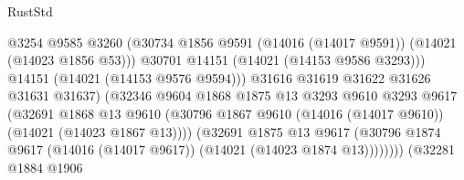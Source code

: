 \begin{lexlean}{RustStd}
\begin{coremodule}
                                              @3254
                                              @9585
                                              @3260
                                              (@30734
                                                @1856
                                                @9591
                                                (@14016 (@14017 @9591))
                                                (@14021 (@14023 @1856 @53)))
                                              @30701
                                              @14151
                                              (@14021 (@14153 @9586 @3293)))
                                            @14151
                                            (@14021 (@14153 @9576 @9594)))
                                          @31616
                                          @31619
                                          @31622
                                          @31626
                                          @31631
                                          @31637)
                                        (@32346
                                          @9604
                                          @1868
                                          @1875
                                          @13
                                          @3293
                                          @9610
                                          @3293
                                          @9617
                                          (@32691
                                            @1868
                                            @13
                                            @9610
                                            (@30796
                                              @1867
                                              @9610
                                              (@14016 (@14017 @9610))
                                              (@14021 (@14023 @1867 @13))))
                                          (@32691
                                            @1875
                                            @13
                                            @9617
                                            (@30796
                                              @1874
                                              @9617
                                              (@14016 (@14017 @9617))
                                              (@14021 (@14023 @1874 @13))))))))
                                  (@32281
                                    @1884
                                    @1906

\end{coremodule}
\end{lexlean}
